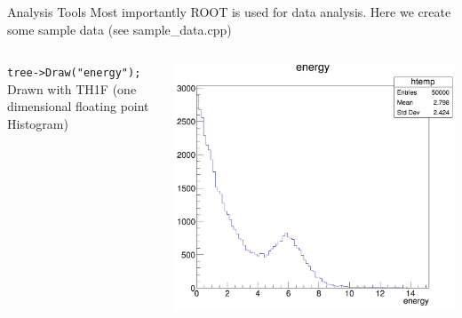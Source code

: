\documentclass[xcolor=svgnames]{beamer}
\begin{document}
\begin{frame}{Analysis Tools}
  Most importantly ROOT is used for data analysis.
  Here we create some sample data (see sample\_data.cpp)
  \begin{columns}
    \begin{column}{0.4\textwidth}
      \texttt{tree->Draw("energy");}
      Drawn with TH1F (one dimensional floating point Histogram)
    \end{column}
    \begin{column}{0.6\textwidth}
      \includegraphics[width=\textwidth]{images/energy.png}            
    \end{column}
  \end{columns}    
\end{frame}
\end{document}
